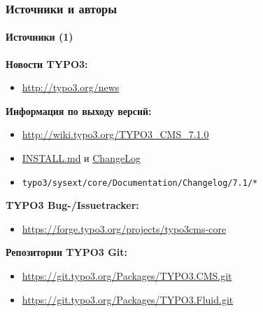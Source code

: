 \begin{frame}[fragile]
	\frametitle{Источники и авторы}
	\framesubtitle{Источники (1)}

	\textbf{Новости TYPO3:}
		\begin{itemize}\smaller
			\item \url{http://typo3.org/news}
		\end{itemize}

	\textbf{Информация по выходу версий:}
		\begin{itemize}\smaller
			\item \url{http://wiki.typo3.org/TYPO3_CMS_7.1.0}
			\item \href{https://github.com/TYPO3/TYPO3.CMS/blob/master/INSTALL.md}{INSTALL.md} и \href{https://github.com/TYPO3/TYPO3.CMS/blob/master/ChangeLog}{ChangeLog}
			\item \texttt{typo3/sysext/core/Documentation/Changelog/7.1/*}
		\end{itemize}

	\textbf{TYPO3 Bug-/Issuetracker:}
		\begin{itemize}\smaller
			\item \url{https://forge.typo3.org/projects/typo3cms-core}
		\end{itemize}

	\textbf{Репозитории TYPO3 Git:}
		\begin{itemize}\smaller
			\item \url{https://git.typo3.org/Packages/TYPO3.CMS.git}
			\item \url{https://git.typo3.org/Packages/TYPO3.Fluid.git}
		\end{itemize}

\end{frame}


